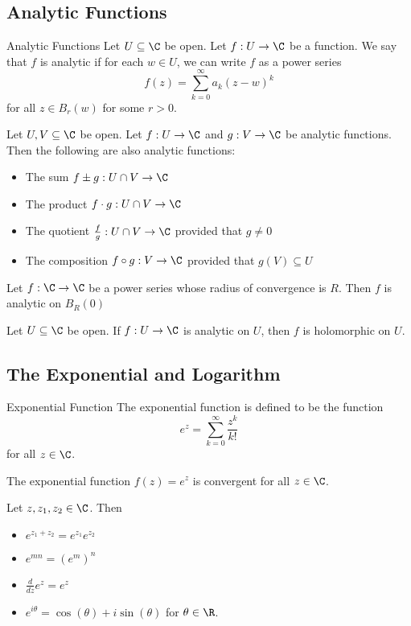 \documentclass[a4paper]{article}
\begin{document}
\subsection{Analytic Functions}
\begin{defn}{Analytic Functions}{} Let $U\subseteq\C$ be open. Let $f:U\to\C$ be a function. We say that $f$ is analytic if for each $w\in U$, we can write $f$ as a power series $$f(z)=\sum_{k=0}^\infty a_k(z-w)^k$$ for all $z\in B_r(w)$ for some $r>0$. 
\end{defn}

\begin{prp}{}{} Let $U,V\subseteq\C$ be open. Let $f:U\to\C$ and $g:V\to\C$ be analytic functions. Then the following are also analytic functions: 
\begin{itemize}
\item The sum $f\pm g:U\cap V\to\C$
\item The product $f\cdot g:U\cap V\to\C$
\item The quotient $\frac{f}{g}:U\cap V\to\C$ provided that $g\neq 0$
\item The composition $f\circ g:V\to\C$ provided that $g(V)\subseteq U$
\end{itemize}
\end{prp}

\begin{prp}{}{} Let $f:\C\to\C$ be a power series whose radius of convergence is $R$. Then $f$ is analytic on $B_R(0)$
\end{prp}

\begin{crl}{}{} Let $U\subseteq\C$ be open. If $f:U\to\C$ is analytic on $U$, then $f$ is holomorphic on $U$. 
\end{crl}

\subsection{The Exponential and Logarithm}
\begin{defn}{Exponential Function}{} The exponential function is defined to be the function $$e^z=\sum_{k=0}^\infty\frac{z^k}{k!}$$ for all $z\in\C$. 
\end{defn}

\begin{thm}{}{} The exponential function $f(z)=e^z$ is convergent for all $z\in\C$. 
\end{thm}

\begin{prp}{}{} Let $z,z_1,z_2\in\C$. Then
\begin{itemize}
\item $e^{z_1+z_2}=e^{z_1}e^{z_2}$
\item $e^{mn}=(e^{m})^n$
\item $\frac{d}{dz}e^z=e^z$
\item $e^{i\theta}=\cos(\theta)+i\sin(\theta)$ for $\theta\in\R$. 
\end{itemize}
\end{prp}
\end{document}
